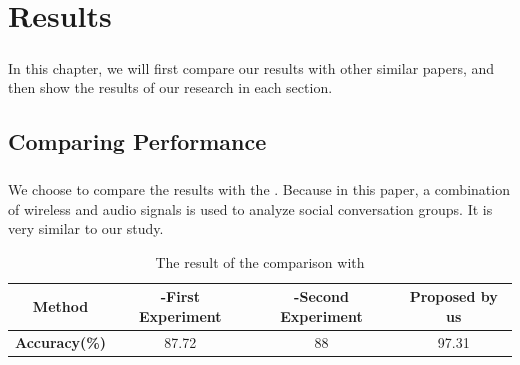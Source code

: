 \documentclass[a4paper,12pt]{report}
\begin{document}

\chapter{Results}
\paragraph{}
In this chapter, we will first compare our results with other similar papers, and then show the results of our research in each section.
\section{Comparing Performance}
\paragraph{}
We choose to compare the results with the \cite{baker2017next2me}. Because in this paper, a combination of wireless and audio signals is used to analyze social conversation groups. It is very similar to our study.

\begin{table}[btph]
\begin{center}
\caption{The result of the comparison with \cite{baker2017next2me}}
\label{t:Result_Comparision}
\begin{tabular}{|c|c|c|c|}
\hline
\textbf{Method} & \cite{baker2017next2me} -First Experiment     & \cite{baker2017next2me} -Second Experiment     & Proposed by us \\ \hline
\textbf{Accuracy(\%)} & 87.72 & 88  & 97.31 \\ \hline
\end{tabular}

\end{center}
\end{table}

\paragraph{}
\end{document}

